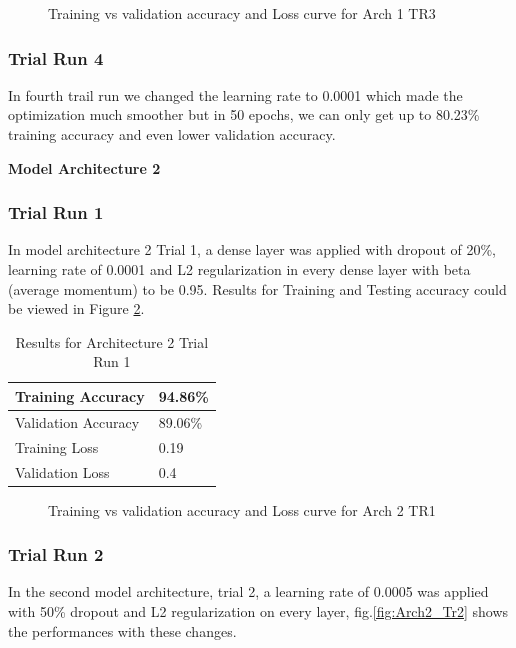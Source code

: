 \documentclass{article}
\begin{document}
\begin{figure}[H]
    \centering
    \qquad
    \caption{Training vs validation accuracy and Loss curve for Arch 1 TR3}%
    \label{fig:Arch1_Tr3}%
\end{figure}


\subsubsection{Trial Run 4}
In fourth trail run we changed the learning rate to 0.0001 which made the optimization much smoother but in 50 epochs, we can only get up to 80.23\% training accuracy and even lower validation accuracy.

\vspace{5 mm}
\newline
\noindent \textbf{Model Architecture 2}

\subsubsection{Trial Run 1}
In model architecture 2 Trial 1, a dense layer was applied with dropout of 20\%, learning rate of 0.0001 and L2 regularization in every dense layer with beta (average momentum) to be 0.95. Results for Training and Testing accuracy could be viewed in Figure \ref{fig:Arch2_Tr1}.

\begin{table}[h]
\centering
\caption{Results for Architecture 2 Trial Run 1}
\begin{tabular}{|l|l|}
\hline
Training Accuracy   & 94.86\% \\ \hline
Validation Accuracy & 89.06\% \\ \hline
Training Loss        & 0.19    \\ \hline
Validation Loss     & 0.4    \\ \hline
\end{tabular}
\end{table}


\begin{figure}[H]
    \centering
    \qquad
    \caption{Training vs validation accuracy and Loss curve for Arch 2 TR1}%
    \label{fig:Arch2_Tr1}%
\end{figure}

\subsubsection{Trial Run 2}
In the second model architecture, trial 2, a learning rate of 0.0005 was applied with 50\% dropout and L2 regularization on every layer, fig.\ref{fig:Arch2_Tr2} shows the performances with these changes.
\end{document}
